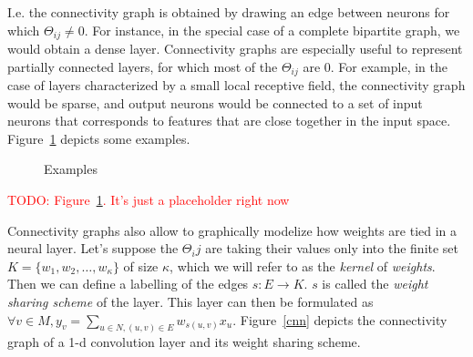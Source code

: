 \documentclass{article}
\theoremstyle{definition}
\newcommand{\todo}[1]{\textcolor{red}{TODO: #1}}
\begin{document}
I.e. the connectivity graph is obtained by drawing an edge between neurons for which $\Theta_{ij} \neq 0$.
For instance, in the special case of a complete bipartite graph, we would obtain a dense layer. 
Connectivity graphs are especially useful to represent partially connected layers, for which most of the $\Theta_{ij}$ are $0$. 
For example, in the case of layers characterized by a small local receptive field, the connectivity graph would be sparse, and output neurons would be connected to a set of input neurons that corresponds to features that are close together in the input space. Figure~\ref{con_ex} depicts some examples.

\begin{figure}[h]
  \begin{center}
  \end{center}
  \caption{Examples}
  \label{con_ex}
\end{figure}

\todo{Figure~\ref{con_ex}. It's just a placeholder right now}


Connectivity graphs also allow to graphically modelize how weights are tied in a neural layer. Let's suppose the $\Theta_ij$ are taking their values only into the finite set $K = \{w_1, w_2, \ldots, w_\kappa\}$ of size $\kappa$, which we will refer to as the \emph{kernel} of \emph{weights}. Then we can define a labelling of the edges $s: E \rightarrow K$. $s$ is called the \emph{weight sharing scheme} of the layer. This layer can then be formulated as $\displaystyle \forall v \in M, y_v = \sum_{u \in N, (u,v) \in E} w_{s(u,v)} x_u$. Figure~\ref{cnn} depicts the connectivity graph of a 1-d convolution layer and its weight sharing scheme.
\end{document}

